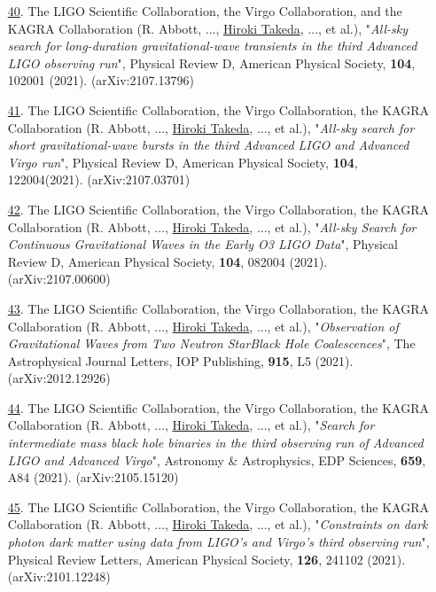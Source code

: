 \documentclass[uplatex, 12pt]{article}
\begin{document}
\begin{enumerate}
\item[\uline{40}.] The LIGO Scientific Collaboration, the Virgo Collaboration, and the KAGRA Collaboration (R. Abbott, ..., \uline{Hiroki Takeda}, ..., et al.), "\emph{All-sky search for long-duration gravitational-wave transients in the third Advanced LIGO observing run}", Physical Review D, American Physical Society, {\bf 104}, 102001 (2021). (arXiv:2107.13796)\\

\item[\uline{41}.] The LIGO Scientific Collaboration, the Virgo Collaboration, the KAGRA Collaboration (R. Abbott, ..., \uline{Hiroki Takeda}, ..., et al.), "\emph{All-sky search for short gravitational-wave bursts in the third Advanced LIGO and Advanced Virgo run}", Physical Review D, American Physical Society, {\bf 104}, 122004(2021). (arXiv:2107.03701)\\

\item[\uline{42}.] The LIGO Scientific Collaboration, the Virgo Collaboration, the KAGRA Collaboration (R. Abbott, ..., \uline{Hiroki Takeda}, ..., et al.), "\emph{All-sky Search for Continuous Gravitational Waves in the Early O3 LIGO Data}", Physical Review D, American Physical Society, {\bf 104}, 082004 (2021). (arXiv:2107.00600)\\

\item[\uline{43}.] The LIGO Scientific Collaboration, the Virgo Collaboration, the KAGRA Collaboration (R. Abbott, ..., \uline{Hiroki Takeda}, ..., et al.), "\emph{Observation of Gravitational Waves from Two Neutron StarBlack Hole Coalescences}", The Astrophysical Journal Letters, IOP Publishing, {\bf 915}, L5 (2021). (arXiv:2012.12926)\\

\item[\uline{44}.] The LIGO Scientific Collaboration, the Virgo Collaboration, the KAGRA Collaboration (R. Abbott, ..., \uline{Hiroki Takeda}, ..., et al.), "\emph{Search for intermediate mass black hole binaries in the third observing run of Advanced LIGO and Advanced Virgo}", Astronomy \& Astrophysics, EDP Sciences, {\bf 659}, A84 (2021). (arXiv:2105.15120)\\

\item[\uline{45}.] The LIGO Scientific Collaboration, the Virgo Collaboration, the KAGRA Collaboration (R. Abbott, ..., \uline{Hiroki Takeda}, ..., et al.), "\emph{Constraints on dark photon dark matter using data from LIGO's and Virgo's third observing run}", Physical Review Letters, American Physical Society, {\bf 126}, 241102 (2021). (arXiv:2101.12248)\\


\end{enumerate}
\end{document}
